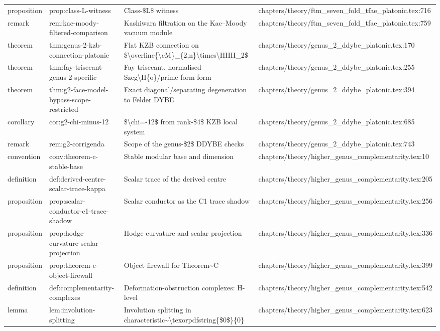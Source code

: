\documentclass[11pt]{article}
\begin{document}
\begin{longtable}{L{0.10\textwidth}L{0.26\textwidth}L{0.42\textwidth}L{0.22\textwidth}}
proposition & prop:class-L-witness & Class-\$L\$ witness & chapters/theory/ftm\_seven\_fold\_tfae\_platonic.tex:716\\
remark & rem:kac-moody-filtered-comparison & Kashiwara filtration on the Kac--Moody vacuum module & chapters/theory/ftm\_seven\_fold\_tfae\_platonic.tex:759\\
theorem & thm:genus-2-kzb-connection-platonic & Flat KZB connection on \$\textbackslash{}overline\{\textbackslash{}cM\}\_\{2,n\}\textbackslash{}times\textbackslash{}HHH\_2\$ & chapters/theory/genus\_2\_ddybe\_platonic.tex:170\\
theorem & thm:fay-trisecant-genus-2-specific & Fay trisecant, normalised Szeg\textbackslash{}H\{o\}/prime-form form & chapters/theory/genus\_2\_ddybe\_platonic.tex:255\\
theorem & thm:g2-face-model-bypass-scope-restricted & Exact diagonal/separating degeneration to Felder DYBE & chapters/theory/genus\_2\_ddybe\_platonic.tex:394\\
corollary & cor:g2-chi-minus-12 & \$\textbackslash{}chi=-12\$ from rank-\$4\$ KZB local system & chapters/theory/genus\_2\_ddybe\_platonic.tex:685\\
remark & rem:g2-corrigenda & Scope of the genus-\$2\$ DDYBE checks & chapters/theory/genus\_2\_ddybe\_platonic.tex:743\\
convention & conv:theorem-c-stable-base & Stable modular base and dimension & chapters/theory/higher\_genus\_complementarity.tex:10\\
definition & def:derived-centre-scalar-trace-kappa & Scalar trace of the derived centre & chapters/theory/higher\_genus\_complementarity.tex:205\\
proposition & prop:scalar-conductor-c1-trace-shadow & Scalar conductor as the C1 trace shadow & chapters/theory/higher\_genus\_complementarity.tex:256\\
proposition & prop:hodge-curvature-scalar-projection & Hodge curvature and scalar projection & chapters/theory/higher\_genus\_complementarity.tex:336\\
proposition & prop:theorem-c-object-firewall & Object firewall for Theorem\textasciitilde{}C & chapters/theory/higher\_genus\_complementarity.tex:399\\
definition & def:complementarity-complexes & Deformation-obstruction complexes: H-level & chapters/theory/higher\_genus\_complementarity.tex:542\\
lemma & lem:involution-splitting & Involution splitting in characteristic\textasciitilde{}\textbackslash{}texorpdfstring\{\$0\$\}\{0\} & chapters/theory/higher\_genus\_complementarity.tex:623\\

\end{longtable}
\end{document}
